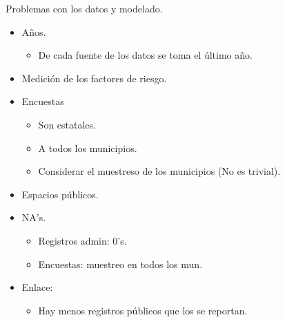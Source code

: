 \documentclass[ignorenonframetext,]{beamer}
\begin{document}
\begin{frame}{Problemas con los datos y modelado.}

\begin{itemize}
\itemsep1pt\parskip0pt
\item
  Años.

  \begin{itemize}
  \itemsep1pt\parskip0pt
  \item
    De cada fuente de los datos se toma el último año.
  \end{itemize}
\item
  Medición de los factores de riesgo.
\item
  Encuestas

  \begin{itemize}
  \itemsep1pt\parskip0pt
  \item
    Son estatales.
  \item
    A todos los municipios.
  \item
    Considerar el muestreso de los municipios (No es trivial).
  \end{itemize}
\item
  Espacios públicos.
\item
  NA's.

  \begin{itemize}
  \itemsep1pt\parskip0pt
  \item
    Registros admin: 0's.
  \item
    Encuestas: muestreo en todos los mun.
  \end{itemize}
\item
  Enlace:

  \begin{itemize}
  \itemsep1pt\parskip0pt
  \item
    Hay menos registros públicos que los se reportan.
  \end{itemize}
\end{itemize}

\end{frame}
\end{document}
